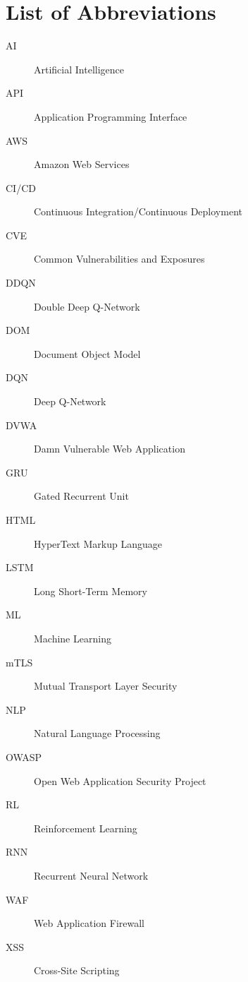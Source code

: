 \chapter*{List of Abbreviations}

\begin{description}
    \item[AI] Artificial Intelligence
    \item[API] Application Programming Interface
    \item[AWS] Amazon Web Services
    \item[CI/CD] Continuous Integration/Continuous Deployment
    \item[CVE] Common Vulnerabilities and Exposures
    \item[DDQN] Double Deep Q-Network
    \item[DOM] Document Object Model
    \item[DQN] Deep Q-Network
    \item[DVWA] Damn Vulnerable Web Application
    \item[GRU] Gated Recurrent Unit
    \item[HTML] HyperText Markup Language
    \item[LSTM] Long Short-Term Memory
    \item[ML] Machine Learning
    \item[mTLS] Mutual Transport Layer Security
    \item[NLP] Natural Language Processing
    \item[OWASP] Open Web Application Security Project
    \item[RL] Reinforcement Learning
    \item[RNN] Recurrent Neural Network
    \item[WAF] Web Application Firewall
    \item[XSS] Cross-Site Scripting
\end{description}
